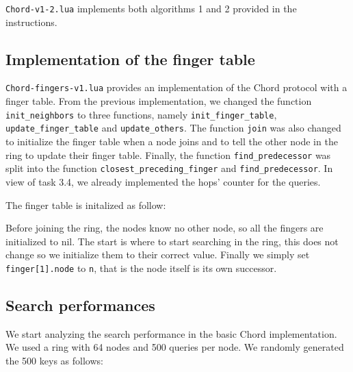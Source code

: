 \documentclass[a4paper, 11pt]{article}
\theoremstyle{plain}
\theoremstyle{definition}
\begin{document}
    \texttt{Chord-v1-2.lua} implements both algorithms 1 and 2 provided in the instructions.


  \subsection{Implementation of the finger table}
  \label{impl-fing-table}

    \texttt{Chord-fingers-v1.lua} provides an implementation of the Chord protocol with a finger table. From
    the previous implementation, we changed the function \texttt{init\_neighbors} to three functions, namely
    \texttt{init\_finger\_table}, \texttt{update\_finger\_table} and \texttt{update\_others}. The function
    \texttt{join} was also changed to initialize the finger table when a node joins and to tell the other node
    in the ring to update their finger table. Finally, the function \texttt{find\_predecessor} was split into
    the function \texttt{closest\_preceding\_finger} and \texttt{find\_predecessor}. In view of task 3.4, we
    already implemented the hops' counter for the queries.

    The finger table is initalized as follow:
    
    \begin{center}
      
    \end{center}

    Before joining the ring, the nodes know no other node, so all the fingers are initialized to nil. The
    start is where to start searching in the ring, this does not change so we initialize them to their correct
    value. Finally we simply set \texttt{finger[1].node} to \texttt{n}, that is the node itself is its own
    successor.


  \subsection{Search performances}
  \label{sec:search-performances}
  
    We start analyzing the search performance in the basic Chord implementation. We used a ring with 64 nodes
    and 500 queries per node. We randomly generated the 500 keys as follows:
    
    
\end{document}
